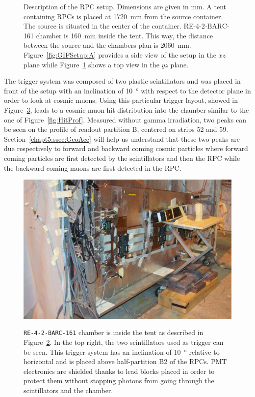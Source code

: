 \begin{figure}[H]
\begin{subfigure}{0.5\linewidth}
			\caption{\label{fig:GIFSetup:B}}
		\end{subfigure}
		\caption{\label{fig:GIFSetup} Description of the RPC setup. Dimensions are given in \si{mm}. A tent containing RPCs is placed at \SI{1720}{mm} from the source container. The source is situated in the center of the container. RE-4-2-BARC-161 chamber is \SI{160}{mm} inside the tent. This way, the distance between the source and the chambers plan is \SI{2060}{mm}. Figure~\ref{fig:GIFSetup:A} provides a side view of the setup in the $xz$ plane while Figure~\ref{fig:GIFSetup:B} shows a top view in the $yz$ plane.}
	\end{figure}
	
	The trigger system was composed of two plastic scintillators and was placed in front of the setup with an inclination of \SI{10}{\degree} with respect to the detector plane in order to look at cosmic muons. Using this particular trigger layout, showed in Figure~\ref{fig:GIF-RPCSetup}, leads to a cosmic muon hit distribution into the chamber similar to the one of Figure~\ref{fig:HitProf}. Measured without gamma irradiation, two peaks can be seen on the profile of readout partition B, centered on strips 52 and 59. Section~\ref{chapt5:ssec:GeoAcc} will help us understand that these two peaks are due respectively to forward and backward coming cosmic particles where forward coming particles are first detected by the scintillators and then the RPC while the backward coming muons are first detected in the RPC.

	\begin{figure}[H]
		\centering
		\includegraphics[width = 0.8\plotwidth]{fig/chapt5/GIF-RPCSetup.jpg}\\
		\caption{\label{fig:GIF-RPCSetup} \texttt{RE-4-2-BARC-161} chamber is inside the tent as described in Figure~\ref{fig:GIFSetup}. In the top right, the two scintillators used as trigger can be seen. This trigger system has an inclination of \SI{10}{\degree} relative to horizontal and is placed above half-partition B2 of the RPCs. PMT electronics are shielded thanks to lead blocks placed in order to protect them without stopping photons from going through the scintillators and the chamber.}
	\end{figure}

